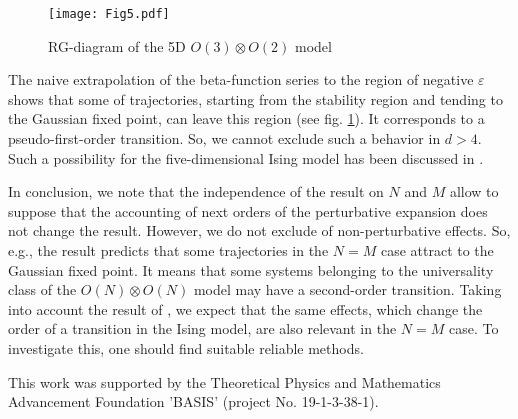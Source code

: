 \documentclass[final,twocolumn]{elsarticle}
\begin{document}
\begin{figure}[t]
    \center
    \texttt{[image: Fig5.pdf]}%
    \caption{\label{fig5} RG-diagram of the 5D $O(3)\otimes O(2)$ model}
\end{figure}%
The naive extrapolation of the beta-function series to the region of negative $\varepsilon$ shows that some of trajectories, starting from the stability region and tending to the Gaussian fixed point, can leave this region (see fig. \ref{fig5}). It corresponds to a pseudo-first-order transition. So, we cannot exclude such a behavior in $d>4$. Such a possibility for the five-dimensional Ising model has been discussed in \cite{Lundow11}.

In conclusion, we note that the independence of the result on $N$ and $M$ allow to suppose that the accounting of next orders of the perturbative expansion does not change the result. However, we do not exclude of non-perturbative effects. So, e.g., the result predicts that some trajectories in the $N=M$ case attract to the Gaussian fixed point. It means that some systems belonging to the universality class of the $O(N)\otimes O(N)$ model may have a second-order transition. Taking into account the result of \cite{Akiyama19},  we expect that the same effects, which change the order of a transition in the Ising model, are also relevant in the $N=M$ case. To investigate this, one should find suitable reliable methods.

\medskip

This work was supported by the Theoretical Physics and Mathematics Advancement Foundation 'BASIS' (project No. 19-1-3-38-1).
\end{document}
